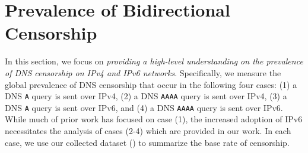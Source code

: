 \section{Prevalence of Bidirectional Censorship}
\label{sec:prevalence}
 In this section, we focus on \emph{providing a high-level
understanding on the prevalence of DNS censorship on IPv4 and IPv6 networks}.
Specifically, we measure the global prevalence of DNS censorship that occur in
the following four cases:
%
(1) a DNS {\tt A} query is sent over IPv4,
(2) a DNS {\tt AAAA} query is sent over IPv4,
(3) a DNS {\tt A} query is sent over IPv6, and
(4) a DNS {\tt AAAA} query is sent over IPv6.
%
While much of prior work has focused on case (1), the increased adoption of
IPv6 necessitates the analysis of cases (2-4) which are provided in our work.
%
In each case, we use our collected dataset (\cf {}) to
summarize the base rate of censorship.

